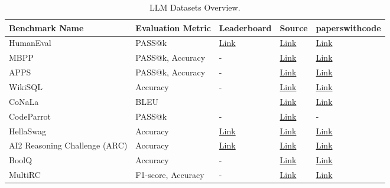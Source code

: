 \documentclass[conference]{IEEEtran}
\begin{document}
\begin{table*}
    \centering
    \caption{LLM Datasets Overview.} 
    \label{table:dataset_overview}
    \begin{tabular}{|m{2.5cm}|m{4cm}|m{2cm}|m{2cm}|m{2cm}|}
    \hline
        \textbf{Benchmark Name} & \textbf{Evaluation Metric} & \textbf{Leaderboard} & \textbf{Source} & \textbf{paperswithcode} \\ \hline
        HumanEval & PASS@k & \href{https://llm-leaderboard.streamlit.app}{Link} & \href{https://github.com/openai/human-eval}{Link} & \href{https://paperswithcode.com/sota/code-generation-on-humaneval}{Link} \\ \hline
        MBPP &  PASS@k, Accuracy  &  - & \href{https://github.com/google-research/google-research/tree/master/mbpp}{Link} & \href{https://paperswithcode.com/sota/code-generation-on-mbpp}{Link} \\ \hline 
        APPS &  PASS@k, Accuracy  &  - & \href{https://github.com/hendrycks/apps}{Link}& \href{https://paperswithcode.com/sota/code-generation-on-apps}{Link} \\ \hline
        WikiSQL & Accuracy &  - & \href{https://github.com/IBM/SQL-to-Text}{Link} & \href{https://paperswithcode.com/sota/code-generation-on-wikisql}{Link}  \\ \hline 
        CoNaLa & BLEU &  ~ & \href{https://conala-corpus.github.io/ }{Link}& \href{https://paperswithcode.com/sota/code-generation-on-conala}{Link}  \\ \hline
        CodeParrot & PASS@k &  - & \href{https://github.com/huggingface/blog/blob/main/codeparrot.md}{Link} & - \\ \hline
        HellaSwag & Accuracy &  \href{https://huggingface.co/spaces/HuggingFaceH4/open\_llm\_leaderboard}{Link}  & \href{https://rowanzellers.com/hellaswag}{Link} & \href{https://paperswithcode.com/sota/sentence-completion-on-hellaswag}{Link} \\ \hline
        AI2 Reasoning Challenge (ARC) & Accuracy &  \href{https://huggingface.co/spaces/HuggingFaceH4/open\_llm\_leaderboard}{Link} & \href{https://github.com/fchollet/ARC/}{Link} & \href{https://paperswithcode.com/sota/common-sense-reasoning-on-arc-challenge}{Link} \\ \hline
        BoolQ & Accuracy &  - & \href{https://github.com/google-research-datasets/boolean-questions}{Link} & \href{https://paperswithcode.com/sota/question-answering-on-boolq}{Link} \\ \hline
        MultiRC &  F1-score, Accuracy  & - & \href{https://cogcomp.seas.upenn.edu/multirc/}{Link} & \href{https://paperswithcode.com/sota/question-answering-on-multirc}{Link} \\ \hline

\end{tabular}
\end{table*}
\end{document}
